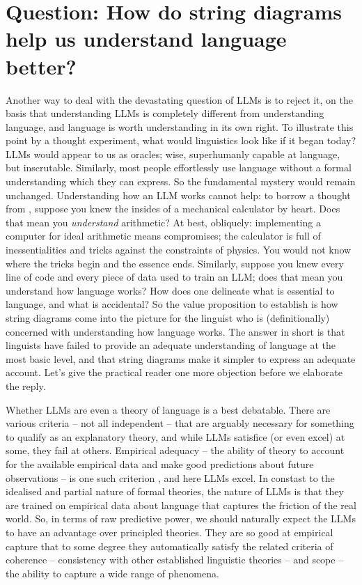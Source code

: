 \section{\textbf{Question:} How do string diagrams help us understand language better?}

Another way to deal with the devastating question of LLMs is to reject it, on the basis that understanding LLMs is completely different from understanding language, and language is worth understanding in its own right. To illustrate this point by a thought experiment, what would linguistics look like if it began today? LLMs would appear to us as oracles; wise, superhumanly capable at language, but inscrutable. Similarly, most people effortlessly use language without a formal understanding which they can express. So the fundamental mystery would remain unchanged. Understanding how an LLM works cannot help: to borrow a thought from \citep{}, suppose you knew the insides of a mechanical calculator by heart. Does that mean you \emph{understand} arithmetic? At best, obliquely: implementing a computer for ideal arithmetic means compromises; the calculator is full of inessentialities and tricks against the constraints of physics. You would not know where the tricks begin and the essence ends. Similarly, suppose you knew every line of code and every piece of data used to train an LLM; does that mean you understand how language works? How does one delineate what is essential to language, and what is accidental? So the value proposition to establish is how string diagrams come into the picture for the linguist who is (definitionally) concerned with understanding how language works. The answer in short is that linguists have failed to provide an adequate understanding of language at the most basic level, and that string diagrams make it simpler to express an adequate account. Let's give the practical reader one more objection before we elaborate the reply.


Whether LLMs are even a theory of language is a best debatable. There are various criteria -- not all independent -- that are arguably necessary for something to qualify as an explanatory theory, and while LLMs satisfice (or even excel) at some, they fail at others. Empirical adequacy -- the ability of theory to account for the available empirical data and make good predictions about future observations -- is one such criterion \citep{}, and here LLMs excel. In constast to the idealised and partial nature of formal theories, the nature of LLMs is that they are trained on empirical data about language that captures the friction of the real world. So, in terms of raw predictive power, we should naturally expect the LLMs to have an advantage over principled theories. They are so good at empirical capture that to some degree they automatically satisfy the related criteria of coherence -- consistency with other established linguistic theories -- and scope -- the ability to capture a wide range of phenomena.\\

